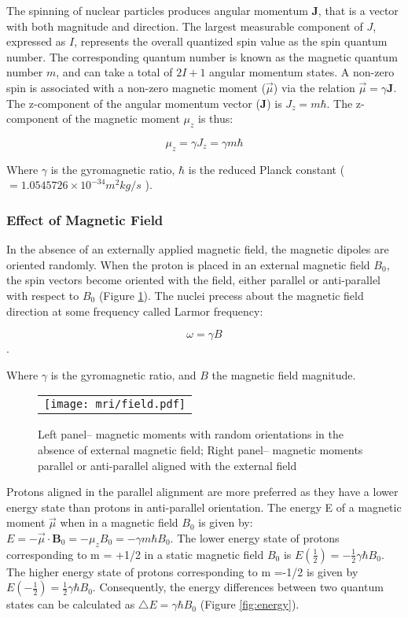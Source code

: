 The spinning of nuclear particles produces angular momentum  $\textbf{J}$, that is a vector with both magnitude and direction. The largest measurable component of $J$, expressed as $I$, represents the overall quantized spin value as the spin quantum number. The corresponding quantum number is known as the magnetic quantum number $m$, and can take a total of $2I + 1$ angular momentum states.  A non-zero spin is associated with a non-zero magnetic moment ($\vec{\mu}$) via the relation $\vec{\mu} =\gamma \textbf{J}$. The z-component of the angular momentum vector (\textbf{J}) is $J_z = m \hbar$. The z-component of the magnetic moment $\mu_z$ is thus: 

$$\mu_z=\gamma J_z=\gamma m \hbar$$

Where $\gamma$ is the gyromagnetic ratio, $\hbar$ is the reduced Planck constant ($=1.0545726 \times 10^{-34} m^2kg/s$ ).

\subsubsection{Effect of Magnetic Field}

In the absence of an externally applied magnetic field, the magnetic dipoles are oriented randomly. When the proton is placed in an external magnetic field $B_0$, the spin vectors become oriented with the field, either parallel or anti-parallel with respect to $B_0$ (Figure \ref{fig:externalB0}). The nuclei precess about the magnetic field direction at some frequency called Larmor frequency: 

$$\omega = \gamma B$$.

Where $\gamma$ is the gyromagnetic ratio, and $B$ the magnetic field magnitude.


\begin{figure}[h]
\begin{center}
\begin{tabular}{c}
\texttt{[image: mri/field.pdf]}
\end{tabular}
\caption{Left panel-- magnetic moments with random orientations in the absence of external magnetic field; Right panel-- magnetic moments parallel or anti-parallel aligned with the external
field} \label{fig:externalB0}
\end{center}
\end{figure}

Protons aligned in the parallel alignment are more preferred as they have a lower energy state than protons in anti-parallel orientation. The energy E of a magnetic moment $\vec{\mu}$ when in a magnetic field $B_0$ is given by: $E=-\vec{\mu}\cdot \textbf{B}_0=-\mu_z B_0=-\gamma m \hbar B_0$. The lower energy state of protons corresponding to m = +1/2 in a static magnetic field $B_0$ is $E(\frac{1}{2})=-\frac{1}{2}\gamma \hbar B_0$. The higher energy state of protons corresponding to m =-1/2 is given by $E(-\frac{1}{2})=\frac{1}{2}\gamma \hbar B_0$.
Consequently, the energy differences between two quantum states can be calculated as $\bigtriangleup E = \gamma \hbar B_0$ (Figure \ref{fig:energy}).

